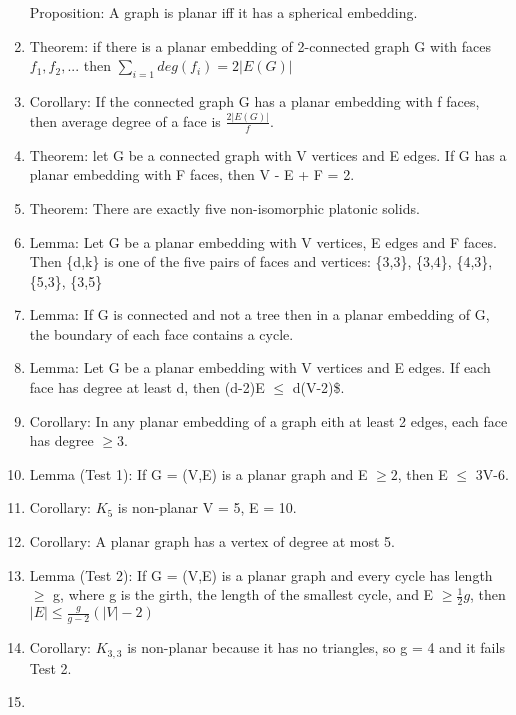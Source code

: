\documentclass[]{article}
\begin{document}
\begin{enumerate}
  Proposition: A graph is planar iff it has a spherical embedding.
\item
  Theorem: if there is a planar embedding of 2-connected graph G with
  faces $f_1, f_2, ...$ then $\sum_{i=1} deg(f_i) = 2|E(G)|$
\item
  Corollary: If the connected graph G has a planar embedding with f
  faces, then average degree of a face is $\frac{2|E(G)|}{f}$.
\item
  Theorem: let G be a connected graph with \textbar{}V\textbar{}
  vertices and \textbar{}E\textbar{} edges. If G has a planar embedding
  with \textbar{}F\textbar{} faces, then \textbar{}V\textbar{} -
  \textbar{}E\textbar{} + \textbar{}F\textbar{} = 2.
\item
  Theorem: There are exactly five non-isomorphic platonic solids.
\item
  Lemma: Let G be a planar embedding with \textbar{}V\textbar{}
  vertices, \textbar{}E\textbar{} edges and \textbar{}F\textbar{} faces.
  Then \{d,k\} is one of the five pairs of faces and vertices: \{3,3\},
  \{3,4\}, \{4,3\}, \{5,3\}, \{3,5\}
\item
  Lemma: If G is connected and not a tree then in a planar embedding of
  G, the boundary of each face contains a cycle.
\item
  Lemma: Let G be a planar embedding with \textbar{}V\textbar{} vertices
  and \textbar{}E\textbar{} edges. If each face has degree at least d,
  then (d-2)\textbar{}E\textbar{} $\leq$ d(\textbar{}V\textbar{}-2)\$.
\item
  Corollary: In any planar embedding of a graph eith at least 2 edges,
  each face has degree $\geq 3$.
\item
  Lemma (Test 1): If G = (V,E) is a planar graph and
  \textbar{}E\textbar{} $\geq 2$, then \textbar{}E\textbar{} $\leq$
  3\textbar{}V\textbar{}-6.
\item
  Corollary: $K_5$ is non-planar \textbar{}V\textbar{} = 5,
  \textbar{}E\textbar{} = 10.
\item
  Corollary: A planar graph has a vertex of degree at most 5.
\item
  Lemma (Test 2): If G = (V,E) is a planar graph and every cycle has
  length $\geq$ g, where g is the girth, the length of the smallest
  cycle, and \textbar{}E\textbar{} $\geq \frac{1}{2}g$, then
  $|E| \leq \frac{g}{g-2}(|V| - 2)$
\item
  Corollary: $K_{3,3}$ is non-planar because it has no triangles, so g =
  4 and it fails Test 2.
\item

\end{enumerate}
\end{document}
